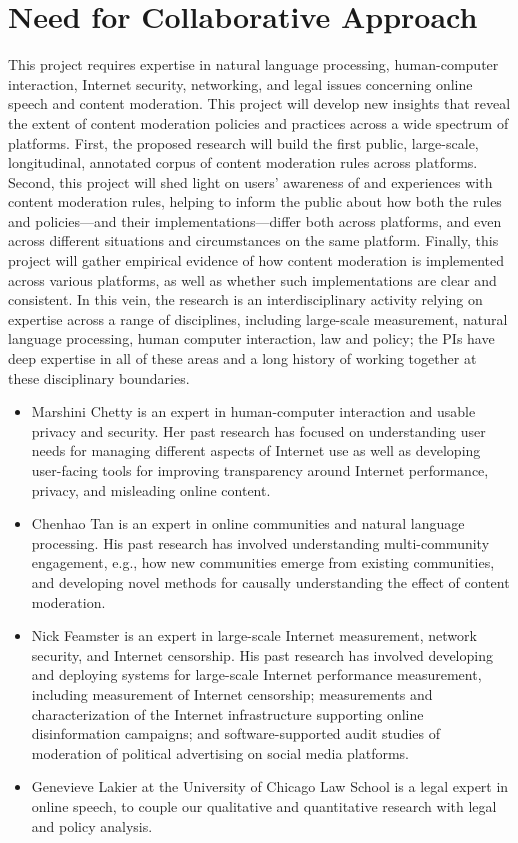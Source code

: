\section{Need for Collaborative Approach}
\label{sec:collaboration}

This project requires expertise in natural language processing, human-computer
interaction, Internet security, networking, and legal issues concerning online
speech and content moderation.  This project will develop new insights that
reveal the extent of content moderation policies and practices across a wide
spectrum of platforms.  First, the proposed research will build the first
public, large-scale, longitudinal, annotated corpus of content moderation
rules across platforms.  Second, this project will shed light on users'
awareness of and experiences with content moderation rules, helping to inform
the public about how both the rules and policies---and their
implementations---differ both across platforms, and even across different
situations and circumstances on the same platform.  Finally, this project will
gather empirical evidence of how content moderation is implemented across
various platforms, as well as whether such implementations are clear and
consistent. In this vein, the research is an interdisciplinary activity
relying on expertise across a range of disciplines, including large-scale
measurement, natural language processing, human computer interaction, law and
policy; the PIs have deep expertise in all of these areas and a long history
of working together at these disciplinary boundaries.

\begin{itemize}
    \item Marshini Chetty is an expert in human-computer interaction and usable privacy and
security. Her past research has focused on understanding user needs for
managing different aspects of Internet use as well as developing user-facing
tools for improving transparency around Internet performance, privacy, and
misleading online content. 
\item Chenhao Tan is an expert in online communities and
natural language processing.  His past research has involved understanding
multi-community engagement, e.g., how new communities emerge from existing
communities, and developing novel methods for causally understanding the
effect of content moderation.  
\item Nick Feamster is an expert in large-scale
Internet measurement, network security, and Internet censorship. His past
research has involved developing and deploying systems for large-scale
Internet performance measurement, including measurement of Internet
censorship; measurements and characterization of the Internet infrastructure
supporting online disinformation campaigns; and software-supported audit
studies of moderation of political advertising on social media platforms. 
\item Genevieve Lakier at the
University of Chicago Law School is a legal expert in online speech, to
couple our qualitative and quantitative research with legal and policy
analysis.
\end{itemize}


